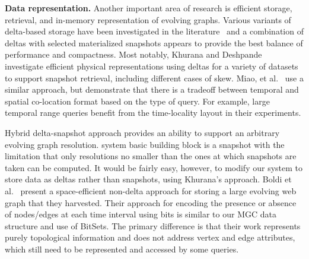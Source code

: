 {\bf Data representation.}  Another important area of research is
efficient storage, retrieval, and in-memory representation of evolving
graphs.  Various variants of delta-based storage have been
investigated in the literature~\cite{Khurana2003,
  DBLP:journals/tos/MiaoHLWYZPCC15, Koloniari2012} and a combination
of deltas with selected materialized snapshots appears to provide the
best balance of performance and compactness.  Most notably, Khurana
and Deshpande~\cite{Khurana2003} investigate efficient physical
representations using deltas for a variety of datasets to support
snapshot retrieval, including different cases of skew. 
Miao, et al.~\cite{DBLP:journals/tos/MiaoHLWYZPCC15} use a similar
approach, but demonstrate that there is a tradeoff between temporal
and spatial co-location format based on the type of query.  For
example, large temporal range queries benefit from the time-locality
layout in their experiments.

Hybrid delta-snapshot approach provides an ability to support an
arbitrary evolving graph resolution.  \ql system basic building block
is a snapshot with the limitation that only resolutions no smaller
than the ones at which snapshots are taken can be computed.  It would
be fairly easy, however, to modify our system to store data as deltas
rather than snapshots, using Khurana's approach.    Boldi et
al.~\cite{Boldi2008} present a space-efficient non-delta approach for
storing a large evolving web graph that they harvested.  Their
approach for encoding the presence or absence of nodes/edges at each
time interval using bits is similar to our MGC data structure and use
of BitSets.  The primary difference is that their work represents
purely topological information and does not address vertex and edge
attributes, which still need to be represented and accessed by some
queries.  

